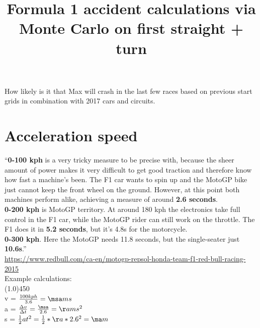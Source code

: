 \documentclass{article}
\begin{document}
\title{Formula 1 accident calculations via Monte Carlo on first straight + turn}
\maketitle

How likely is it that Max will crash in the last few races based on previous start grids in combination with 2017 cars and circuits.

\section{Acceleration speed}

``\textbf{0-100 kph} is a very tricky measure to be precise with, because the sheer amount of power makes it very difficult to get good traction and therefore know how fast a machine's been. The F1 car wants to spin up and the MotoGP bike just cannot keep the front wheel on the ground. However, at this point both machines perform alike, achieving a measure of around \textbf{2.6 seconds}. \\

\noindent
\textbf{0-200 kph} is MotoGP territory. At around 180 kph the electronics take full control in the F1 car, while the MotoGP rider can still work on the throttle. The F1 does it in \textbf{5.2 seconds}, but it's 4.8s for the motorcycle. \\

\noindent
\textbf{0-300 kph}. Here the MotoGP needs 11.8 seconds, but the single-seater just \textbf{10.6s}.''\\
\url{https://www.redbull.com/ca-en/motogp-repsol-honda-team-f1-red-bull-racing-2015} \\

Example calculations: \\
\line(1.0){450} \\

v = $\frac{100kph}{3.6}=\msa ms$\\

\def\time{2.6}
\DIVIDE{\msa}{\time}{\aa}
a = $\frac{\Delta v}{\Delta t} = \frac{\msa}{\time} = \aa ms^2$\\

\SQUARE{\time}{\square}
\MULTIPLY{\aa}{\square}{\tmp}
s = $\frac{1}{2} at^2 = \frac{1}{2} * \aa * \time^2 = \ma m $\\
\end{document}
